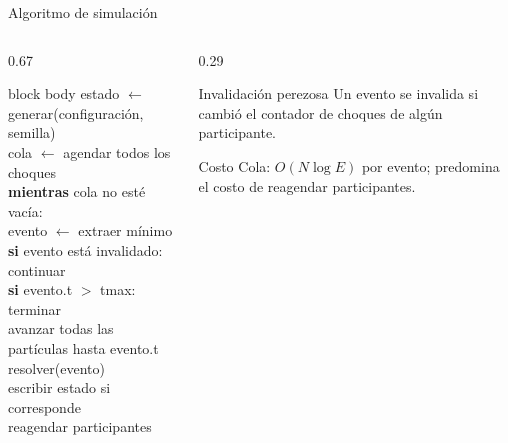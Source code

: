 \documentclass[aspectratio=169,11pt]{beamer}
\begin{document}
\begin{frame}{Algoritmo de simulación}
  \begin{columns}[T,onlytextwidth]
    \begin{column}{0.67\textwidth}
      \begin{beamercolorbox}[sep=0.6em,rounded=true]{block body}
        {\small\ttfamily
        estado $\leftarrow$ generar(configuración, semilla)\\[0.25em]
        cola $\leftarrow$ agendar todos los choques\\
        \textbf{mientras} cola no esté vacía:\\
        \quad evento $\leftarrow$ extraer mínimo\\
        \quad \textbf{si} evento está invalidado: continuar\\
        \quad \textbf{si} evento.t $>$ tmax: terminar\\
        \quad avanzar todas las partículas hasta evento.t\\
        \quad resolver(evento)\\
        \quad escribir estado si corresponde\\
        \quad reagendar participantes
        }
      \end{beamercolorbox}
    \end{column}
    \begin{column}{0.29\textwidth}
      \begin{block}{Invalidación perezosa}
        Un evento se invalida si cambió el contador de choques de algún participante.
      \end{block}
      \begin{block}{Costo}
        Cola: $O(N\log E)$ por evento; predomina el costo de reagendar participantes.
      \end{block}
    \end{column}
  \end{columns}
\end{frame}
\end{document}
